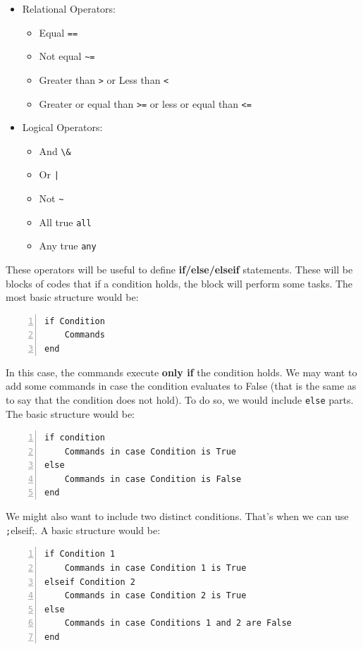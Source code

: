 \documentclass[a4paper,11pt]{article}
\begin{document}
\begin{itemize}
	\item Relational Operators:
	\begin{itemize}
		\item Equal \verb;==;
		\item Not equal \verb;~=;
		\item Greater than \verb;>; or Less than \verb;<;
		\item Greater or equal than \verb;>=; or less or equal than \verb;<=;
	\end{itemize}
	\item Logical Operators:
	\begin{itemize}
		\item And \verb;\&;
		\item Or \verb;|;
		\item Not \verb;~;
		\item All true \verb;all;
		\item Any true \verb;any;
	\end{itemize}
\end{itemize}

These operators will be useful to define \textbf{if/else/elseif} statements. These will be blocks of codes that if a condition holds, the block will perform some tasks. The most basic structure would be:

\begin{Verbatim}[numbers=left, fontsize = \small]
if Condition
	Commands
end
\end{Verbatim}

In this case, the commands execute \textbf{only if} the condition holds. We may want to add some commands in case the condition evaluates to False (that is the same as to say that the condition does not hold). To do so, we would include \verb;else; parts. The basic structure would be:

\begin{Verbatim}[numbers=left, fontsize = \small]
if condition
	Commands in case Condition is True
else
	Commands in case Condition is False
end	
\end{Verbatim}

We might also want to include two distinct conditions. That's when we can use \texttt;elseif;. A basic structure would be:

\begin{Verbatim}[numbers=left, fontsize = \small]
if Condition 1
	Commands in case Condition 1 is True
elseif Condition 2
	Commands in case Condition 2 is True
else
	Commands in case Conditions 1 and 2 are False
end
\end{Verbatim}
\end{document}
